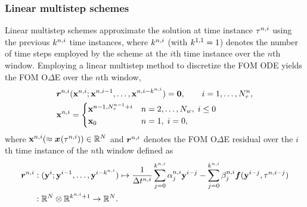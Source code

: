 \subsubsection{Linear multistep schemes}
Linear multistep schemes approximate the solution at time instance $\tau^{n,i}$ using the previous $k^{n,i}$ time instances, where $k^{n,i}$ (with $k^{1,1} = 1$) denotes the number of time steps employed by the scheme at the $i$th time instance over the $n$th window. 
Employing a linear multistep method to discretize the FOM ODE yields the FOM O$\Delta$E over the $n$th window,
\begin{align*}
&\boldsymbol r_{}^{n,i} ({\mathbf{x}}^{n,i};{\mathbf{x}}^{n,i-1},\ldots,{\mathbf{x}}^{n,i-k^{n,i}}) = \boldsymbol 0, \qquad i=1,\ldots,N_{\tau}^{n}, \\
&{\mathbf{x}}^{n,i} = 
\begin{cases}
{\mathbf{x}}^{n-1,N_{\tau}^{n-1}+i} & n = 2,\ldots,N_w, \; i \le 0 \\
{{\mathbf{x}}_0} & n=1, \; i=0,\end{cases}
\end{align*}
where ${\mathbf{x}}^{n,i} (\approx
{\boldsymbol x}^{}(\tau^{n,i}))
\in \mathbb{R}^{N}$ and $\boldsymbol r_{}^{n,i}$ denotes the FOM O$\Delta$E
residual over the $i$th time instance of the $n$th window  
defined as
\begin{align*}
\boldsymbol r_{}^{n,i} &: (\mathbf{y}^{i};\mathbf{y}^{i-1},\ldots,\mathbf{y}^{i-k^{n,i}}) \mapsto  \frac{1}{\Delta t^{n,i}} \sum_{j=0}^{k^{n,i}} \alpha^{n,i}_j \mathbf{y}^{i-j} -  \sum_{j=0}^{k^{n,i}} \beta^{n,i}_j \boldsymbol f(\mathbf{y}^{i-j},\tau^{n,i-j}) \\
               &: \mathbb{R}^{N} \otimes \mathbb{R}^{k^{n,i}+1} \rightarrow \mathbb{R}^{N}. 
\end{align*}
